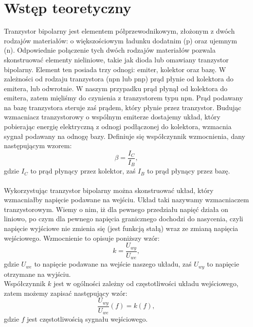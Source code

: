 \documentclass[10pt,a4paper]{article}
\begin{document}
\section*{Wstęp teoretyczny}
Tranzystor bipolarny jest elementem półprzewodnikowym, złożonym z dwóch rodzajów materiałów: o większościowym ładunku dodatnim (p) oraz ujemnym (n). Odpowiednie połączenie tych dwóch rodzajów materiałów pozwala skonstruować elementy nieliniowe, takie jak dioda lub omawiany tranzystor bipolarny. Element ten posiada trzy odnogi: emiter, kolektor oraz bazę. W zależności od rodzaju tranzystora (npn lub pnp) prąd płynie od kolektora do emitera, lub odwrotnie. W naszym przypadku prąd płynął od kolektora do emitera, zatem mięliśmy do czynienia z tranzystorem typu npn. Prąd podawany na bazę tranzystora steruje zaś prądem, który płynie przez tranzystor. Budując wzmacniacz tranzystorowy o wspólnym emiterze dostajemy układ, który pobierając energię elektryczną z odnogi podłączonej do kolektora, wzmacnia sygnał podawany na odnogę bazy.
Definiuje się współczynnik wzmocnienia, dany następującym wzorem:
\begin{equation}
\beta = \frac{I_C}{I_B},
\end{equation}
gdzie $I_C$ to prąd płynący przez kolektor, zaś $I_B$ to prąd płynący przez bazę. \\ \\
Wykorzystując tranzystor bipolarny można skonstruować układ, który wzmacniałby napięcie podawane na wejściu. Układ taki nazywamy wzmacniaczem tranzystorowym. Wiemy o nim, iż dla pewnego przedziału napięć działa on liniowo, po czym dla pewnego napięcia granicznego dochodzi do nasycenia, czyli napięcie wyjściowe nie zmienia się (jest funkcją stałą) wraz ze zmianą napięcia wejściowego. Wzmocnienie to opisuje poniższy wzór:
\begin{equation}
k = 	\frac{U_{wy}}{U_{we}},
\end{equation}
gdzie $U_{we}$ to napięcie podawane na wejście naszego układu, zaś $U_{wy}$ to napięcie otrzymane na wyjściu. \\
Współczynnik $k$ jest w ogólności zależny od częstotliwości układu wejściowego, zatem możemy zapisać następujący wzór:
\begin{equation}
	\frac{U_{wy}}{U_{we}} (f) = k(f),
\end{equation}
gdzie $f$ jest częstotliwością sygnału wejściowego.
\end{document}
